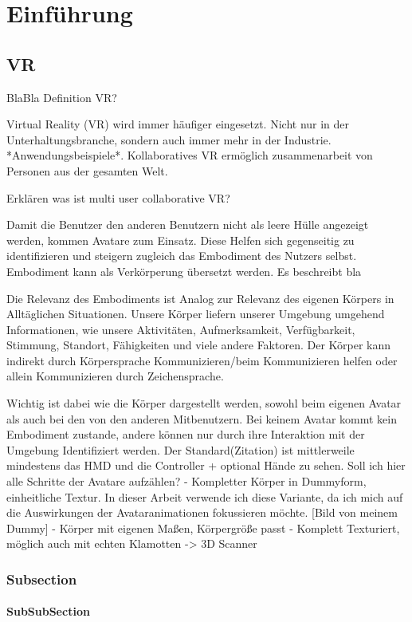 \chapter{Einführung}



\section{VR}
BlaBla\cite{Dummer2009}
Definition VR?

Virtual Reality (VR) wird immer häufiger eingesetzt. Nicht nur in der Unterhaltungsbranche, sondern auch immer mehr in der Industrie. *Anwendungsbeispiele*.
Kollaboratives VR ermöglich zusammenarbeit von Personen aus der gesamten Welt.

Erklären was ist multi user collaborative VR?

Damit die Benutzer den anderen Benutzern nicht als leere Hülle angezeigt werden, kommen Avatare zum Einsatz. Diese Helfen sich gegenseitig zu identifizieren und steigern zugleich das Embodiment des Nutzers selbst. Embodiment kann als Verkörperung übersetzt werden. Es beschreibt bla

Die Relevanz des Embodiments ist Analog zur Relevanz des eigenen Körpers in Alltäglichen Situationen. Unsere Körper liefern unserer Umgebung umgehend Informationen, wie unsere Aktivitäten, Aufmerksamkeit, Verfügbarkeit, Stimmung, Standort, Fähigkeiten und viele andere Faktoren. Der Körper kann indirekt durch Körpersprache Kommunizieren/beim Kommunizieren helfen oder allein Kommunizieren durch Zeichensprache.\cite{Benford2010}

Wichtig ist dabei wie die Körper dargestellt werden, sowohl beim eigenen Avatar als auch bei den von den anderen Mitbenutzern. Bei keinem Avatar kommt kein Embodiment zustande, andere können nur durch ihre Interaktion mit der Umgebung Identifiziert werden. Der Standard(Zitation) ist mittlerweile mindestens das HMD und die Controller + optional Hände zu sehen. \cite{Benford2010}
Soll ich hier alle Schritte der Avatare aufzählen?
- Kompletter Körper in Dummyform, einheitliche Textur. In dieser Arbeit verwende ich diese Variante, da ich mich auf die Auswirkungen der Avataranimationen fokussieren möchte. 
[Bild von meinem Dummy]
- Körper mit eigenen Maßen, Körpergröße passt
- Komplett Texturiert, möglich auch mit echten Klamotten -> 3D Scanner

\subsection{Subsection}

\subsubsection{SubSubSection}